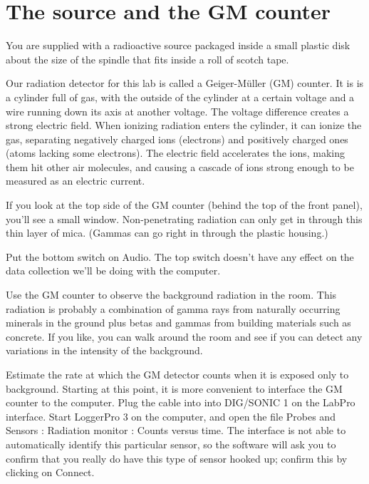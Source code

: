 \section*{The source and the GM counter}

You are supplied with a radioactive source packaged inside
a small plastic disk about the size of the spindle that
fits inside a roll of scotch tape.

Our radiation detector for this lab is called a Geiger-M\"{u}ller (GM) counter.
It is is a cylinder full of gas, with the outside
of the cylinder at a certain voltage and a wire running down
its axis at another voltage. The voltage difference creates
a strong electric field. When ionizing radiation enters
the cylinder, it can ionize the gas, separating negatively
charged ions (electrons) and positively charged ones
(atoms lacking some electrons). The electric field accelerates
the ions, making them hit other air molecules, and causing
a cascade of ions strong enough to be measured as an electric
current.

If you look at the top side of the GM counter (behind the top of the front panel),
you'll see a small window. Non-penetrating radiation can only get in through
this thin layer of mica. (Gammas can go right in through the plastic housing.)

Put the bottom switch on Audio. The top switch doesn't have any effect
on the data collection we'll be doing with the computer.

\observations



Use the GM counter to observe the background radiation in the room. This radiation is
probably a combination of gamma rays from naturally occurring minerals
in the ground plus betas and gammas from building materials such 
as concrete. If you like, you can walk around the room and see if you can detect
any variations in the intensity of the background.

Estimate the rate at which the GM detector counts when it is exposed
only to background. Starting at this point, it is more convenient to
interface the GM counter to the computer. Plug the cable into
into DIG/SONIC 1 on the LabPro interface. Start LoggerPro 3 on the
computer, and open the file Probes and Sensors : Radiation monitor : Counts versus time.
The interface is not able to automatically identify this particular sensor, so
the software will ask you to confirm that you really do have this type of sensor
hooked up; confirm this by clicking on Connect.

